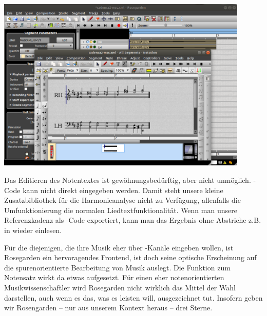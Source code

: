 \begin{center}
\includegraphics[width=0.9\textwidth]{frontends/rosegarden/rosegarden-cadenca2-300dpi.png}
\end{center}

Das Editieren des Notentextes ist gewöhnungsbedürftig, aber nicht unmöglich.
-Code kann nicht direkt eingegeben werden. Damit steht unsere
kleine Zusatzbibliothek für die Harmonieanalyse nicht zu Verfügung, allenfalls
die Umfunktionierung die normalen Liedtextfunktionalität. Wenn man unsere
Referenzkadenz als -Code exportiert, kann man das Ergebnis ohne
Abstriche z.B. in  wieder einlesen.

Für die diejenigen, die ihre Musik eher über -Kanäle eingeben wollen,
ist Rosegarden ein hervoragendes Frontend, ist doch seine optische Erscheinung
auf die spurenorientierte Bearbeitung von Musik auslegt. Die Funktion zum
Notensatz wirkt da etwas aufgesetzt. Für einen eher notenorientierten
Musikwissenschaftler wird Rosegarden nicht wirklich das Mittel der Wahl darstellen,
auch wenn es das, was es leisten will, ausgezeichnet tut. Insofern geben wir 
Rosengarden -- nur aus unserem Kontext heraus -- drei Sterne.


%
